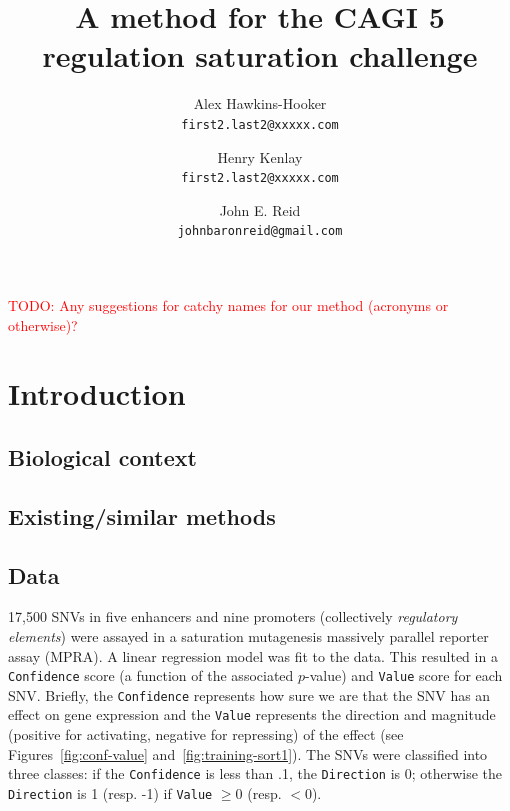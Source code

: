 \documentclass{article}
\author{
  Alex Hawkins-Hooker \\
  \texttt{first2.last2@xxxxx.com}
  \and
  Henry Kenlay \\
  \texttt{first2.last2@xxxxx.com}
  \and
  John E. Reid \\
  \texttt{johnbaronreid@gmail.com}
}
\title{A method for the CAGI 5 regulation saturation challenge}
\newcommand{\todo}[1]{\textcolor{red}{TODO: #1}}
\begin{document}
\maketitle


\todo{Any suggestions for catchy names for our method (acronyms or otherwise)?}


\section*{Introduction}

\subsection*{Biological context}


\subsection*{Existing/similar methods}


\subsection*{Data}

17,500 SNVs in five enhancers and nine promoters (collectively \emph{regulatory
elements}) were assayed in a saturation mutagenesis massively parallel reporter
assay (MPRA). A linear regression model was fit to the data. This resulted in a
\texttt{Confidence} score (a function of the associated $p$-value) and
\texttt{Value} score for each SNV. Briefly, the \texttt{Confidence} represents
how sure we are that the SNV has an effect on gene expression and the
\texttt{Value} represents the direction and magnitude (positive for activating,
negative for repressing) of the effect (see Figures~\ref{fig:conf-value}
and~\ref{fig:training-sort1}). The SNVs were classified into three classes: if
the \texttt{Confidence} is less than .1, the \texttt{Direction} is 0; otherwise
the \texttt{Direction} is 1 (resp. -1) if \texttt{Value} $\ge 0$ (resp. $< 0$).
\end{document}
